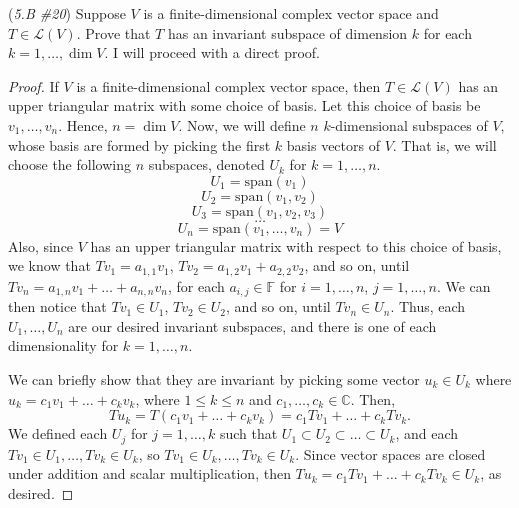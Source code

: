 \documentclass{article}
\renewcommand{\L}{\mathcal{L}}
\newcommand{\spans}{\mathrm{span}}
\newcommand{\F}{\mathbb{F}}
\newcommand{\C}{\mathbb{C}}
\theoremstyle{definition}
\begin{document}
\begin{problem}{(\textit{5.B \#20}) Suppose $V$ is a finite-dimensional complex vector space and $T \in \L(V)$. Prove that $T$ has an invariant subspace of dimension $k$ for each $k = 1, \dots, \dim V$.}
    I will proceed with a direct proof.
    \begin{proof}
        If $V$ is a finite-dimensional complex vector space, then $T \in \L(V)$ has an upper triangular matrix with some choice of basis. Let this choice of basis be $v_1, \dots, v_n$. Hence, $n = \dim V$. Now, we will define $n$ $k$-dimensional subspaces of $V$, whose basis are formed by picking the first $k$ basis vectors of $V$. That is, we will choose the following $n$ subspaces, denoted $U_k$ for $k = 1, \dots, n$.
        $$U_1 = \spans(v_1)$$
        $$U_2 = \spans(v_1, v_2)$$
        $$U_3 = \spans(v_1, v_2, v_3)$$
        $$\dots$$
        $$U_n = \spans(v_1, \dots, v_n) = V$$
        Also, since $V$ has an upper triangular matrix with respect to this choice of basis, we know that $Tv_1 = a_{1, 1}v_1$, $Tv_2 = a_{1, 2}v_1 + a_{2, 2}v_2$, and so on, until $Tv_n = a_{1, n}v_1 + \dots + a_{n, n}v_n$, for each $a_{i, j} \in \F$ for $i = 1, \dots, n$, $j = 1, \dots, n$. We can then notice that $Tv_1 \in U_1$, $Tv_2 \in U_2$, and so on, until $Tv_n \in U_n$. Thus, each $U_1, \dots, U_n$ are our desired invariant subspaces, and there is one of each dimensionality for $k = 1, \dots, n$.

        We can briefly show that they are invariant by picking some vector $u_k \in U_k$ where $u_k = c_1v_1 + \dots + c_kv_k$, where $1 \leq k \leq n$ and $c_1, \dots, c_k \in \C$. Then, $$Tu_k = T(c_1v_1 + \dots + c_kv_k) = c_1Tv_1 + \dots + c_kTv_k.$$ We defined each $U_j$ for $j = 1, \dots, k$ such that $U_1 \subset U_2 \subset \dots \subset U_k$, and each $Tv_1 \in U_1, \dots, Tv_k \in U_k$, so $Tv_1 \in U_k, \dots, Tv_k \in U_k$. Since vector spaces are closed under addition and scalar multiplication, then $Tu_k = c_1Tv_1 + \dots + c_kTv_k \in U_k$, as desired.
    \end{proof}
\end{problem}
\end{document}

